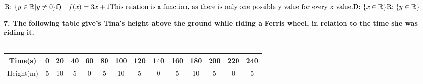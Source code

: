 \documentclass[14pt, a4paper]{extarticle}
\begin{document}
\begin{adjustwidth}{1cm}{0pt}
\begin{math}
        \text{R: } \{y \in \mathbb{R} | y \neq 0\} \\
        \\
        \textbf{f)} \quad f(x) = 3x + 1 \\
        \text{This relation is a function, as there is only one possible y value for every x value.} \\
        \text{D: } \{x \in \mathbb{R}\} \\
        \text{R: } \{y \in \mathbb{R}\} \\
        \\
    \end{math}
\end{adjustwidth}

\textbf{7. The following table give's Tina's height above the ground while riding a Ferris wheel, in relation to the time she was riding it.} \\ \\
\begin{tabular}{| c | c | c | c | c | c | c | c | c | c | c | c | c | c |}
    \hline
    Time(s) & 0 & 20 & 40 & 60 & 80 & 100 & 120 & 140 & 160 & 180 & 200 & 220 & 240 \\
    \hline
    Height(m) & 5 & 10 & 5 & 0 & 5 & 10 & 5 & 0 & 5 & 10 & 5 & 0 & 5 \\
    \hline
\end{tabular}
\\
\end{document}
